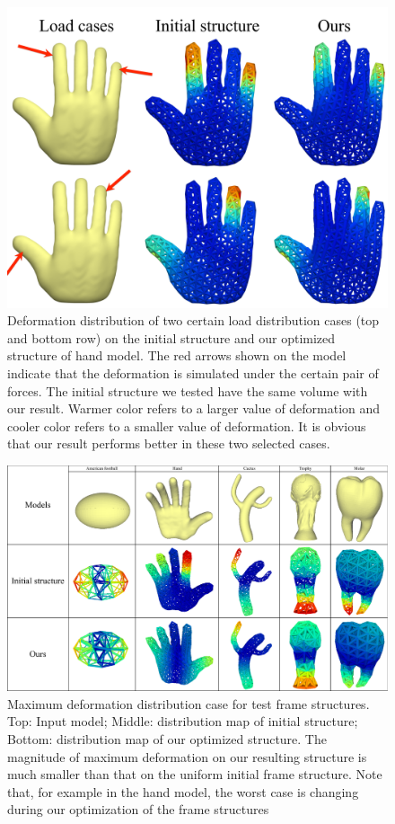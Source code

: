 \begin{figure}[h]
  \centering
  \includegraphics[width=0.5\linewidth]{Figures/hand/hand.pdf}
  \caption{\label{fig_frame_hand_case} Deformation distribution of two certain load distribution cases (top and bottom row) on the initial structure and our optimized structure of hand model. The red arrows shown on the model indicate that the deformation is simulated under the certain pair of forces. The initial structure we tested have the same volume with our result. Warmer color refers to a larger value of deformation and cooler color refers to a smaller value of deformation. It is obvious that our result performs better in these two selected cases.}
\end{figure}

\begin{figure}[t]

  \centering
            \includegraphics[width=.85\linewidth]{Figures/fig4/fig4.pdf}
    
\caption{\label{fig_frame_max}
  Maximum deformation distribution case for test frame structures.
            Top: Input model; Middle: distribution map of initial structure; Bottom: distribution map of our optimized structure.
            The magnitude of maximum deformation on our resulting structure is much smaller than that on the uniform initial frame structure. Note that, for example in the hand model, the worst case is changing during our optimization of the frame structures}
\end{figure}

